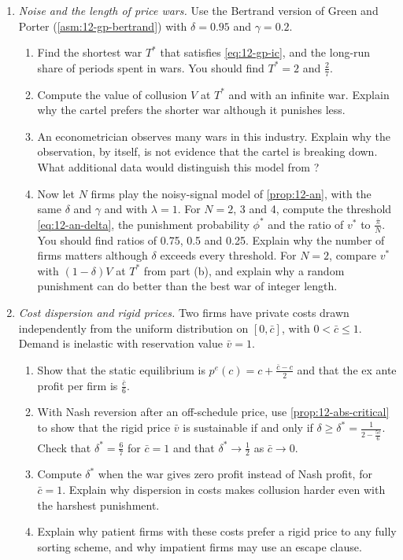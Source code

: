 \begin{enumerate}[label=\arabic*., leftmargin=*, itemsep=6pt]
\item \textit{Noise and the length of price wars.} Use the Bertrand version of Green and Porter
(\cref{asm:12-gp-bertrand}) with $\delta = 0.95$ and $\gamma = 0.2$.
\begin{enumerate}[label=(\alph*)]
  \item Find the shortest war $T^*$ that satisfies \eqref{eq:12-gp-ic}, and the long-run share of periods spent in
  wars. You should find $T^* = 2$ and $\frac{2}{7}$.
  \item Compute the value of collusion $V$ at $T^*$ and with an infinite war. Explain why the cartel prefers the
  shorter war although it punishes less.
  \item An econometrician observes many wars in this industry. Explain why the observation, by itself, is not
  evidence that the cartel is breaking down. What additional data would distinguish this model from
  \citet{RotembergSaloner1986}?
  \item Now let $N$ firms play the noisy-signal model of \cref{prop:12-an}, with the same $\delta$ and $\gamma$ and with
  $\lambda = 1$. For $N = 2$, 3 and 4, compute the threshold \eqref{eq:12-an-delta}, the punishment probability
  $\phi^*$ and the ratio of $v^*$ to $\frac{\bar\pi}{N}$. You should find ratios of 0.75, 0.5 and 0.25. Explain why the
  number of firms matters although $\delta$ exceeds every threshold. For $N = 2$, compare $v^*$ with $(1 - \delta)V$ at
  $T^*$ from part (b), and explain why a random punishment can do better than the best war of integer length.
\end{enumerate}

\item \textit{Cost dispersion and rigid prices.} Two firms have private costs drawn independently from the uniform
distribution on $[0, \bar c]$, with $0 < \bar c \le 1$. Demand is inelastic with reservation value $\bar v = 1$.
\begin{enumerate}[label=(\alph*)]
  \item Show that the static equilibrium is $p^e(c) = c + \frac{\bar c - c}{2}$ and that the ex ante profit per
  firm is $\frac{\bar c}{6}$.
  \item With Nash reversion after an off-schedule price, use \cref{prop:12-abs-critical} to show that the rigid
  price $\bar v$ is sustainable if and only if $\delta \ge \delta^* = \frac{1}{2 - \frac{5\bar c}{6}}$. Check that
  $\delta^* = \frac{6}{7}$ for $\bar c = 1$ and that $\delta^* \to \frac{1}{2}$ as $\bar c \to 0$.
  \item Compute $\delta^*$ when the war gives zero profit instead of Nash profit, for $\bar c = 1$. Explain why
  dispersion in costs makes collusion harder even with the harshest punishment.
  \item Explain why patient firms with these costs prefer a rigid price to any fully sorting scheme, and why
  impatient firms may use an escape clause.
\end{enumerate}


\end{enumerate}
